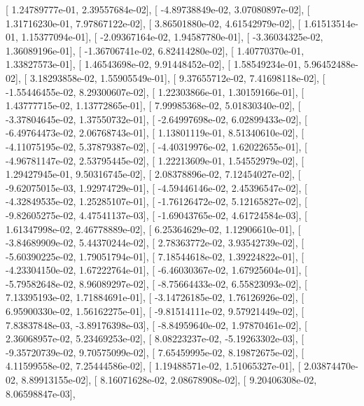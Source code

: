 \documentclass{article}
\begin{document}
       [  1.24789777e-01,   2.39557684e-02],
       [ -4.89738849e-02,   3.07080897e-02],
       [  1.31716230e-01,   7.97867122e-02],
       [  3.86501880e-02,   4.61542979e-02],
       [  1.61513514e-01,   1.15377094e-01],
       [ -2.09367164e-02,   1.94587780e-01],
       [ -3.36034325e-02,   1.36089196e-01],
       [ -1.36706741e-02,   6.82414280e-02],
       [  1.40770370e-01,   1.33827573e-01],
       [  1.46543698e-02,   9.91448452e-02],
       [  1.58549234e-01,   5.96452488e-02],
       [  3.18293858e-02,   1.55905549e-01],
       [  9.37655712e-02,   7.41698118e-02],
       [ -1.55446455e-02,   8.29300607e-02],
       [  1.22303866e-01,   1.30159166e-01],
       [  1.43777715e-02,   1.13772865e-01],
       [  7.99985368e-02,   5.01830340e-02],
       [ -3.37804645e-02,   1.37550732e-01],
       [ -2.64997698e-02,   6.02899433e-02],
       [ -6.49764473e-02,   2.06768743e-01],
       [  1.13801119e-01,   8.51340610e-02],
       [ -4.11075195e-02,   5.37879387e-02],
       [ -4.40319976e-02,   1.62022655e-01],
       [ -4.96781147e-02,   2.53795445e-02],
       [  1.22213609e-01,   1.54552979e-02],
       [  1.29427945e-01,   9.50316745e-02],
       [  2.08378896e-02,   7.12454027e-02],
       [ -9.62075015e-03,   1.92974729e-01],
       [ -4.59446146e-02,   2.45396547e-02],
       [ -4.32849535e-02,   1.25285107e-01],
       [ -1.76126472e-02,   5.12165827e-02],
       [ -9.82605275e-02,   4.47541137e-03],
       [ -1.69043765e-02,   4.61724584e-03],
       [  1.61347998e-02,   2.46778889e-02],
       [  6.25364629e-02,   1.12906610e-01],
       [ -3.84689909e-02,   5.44370244e-02],
       [  2.78363772e-02,   3.93542739e-02],
       [ -5.60390225e-02,   1.79051794e-01],
       [  7.18544618e-02,   1.39224822e-01],
       [ -4.23304150e-02,   1.67222764e-01],
       [ -6.46030367e-02,   1.67925604e-01],
       [ -5.79582648e-02,   8.96089297e-02],
       [ -8.75664433e-02,   6.55823093e-02],
       [  7.13395193e-02,   1.71884691e-01],
       [ -3.14726185e-02,   1.76126926e-02],
       [  6.95900330e-02,   1.56162275e-01],
       [ -9.81514111e-02,   9.57921449e-02],
       [  7.83837848e-03,  -3.89176398e-03],
       [ -8.84959640e-02,   1.97870461e-02],
       [  2.36068957e-02,   5.23469253e-02],
       [  8.08223237e-02,  -5.19263302e-03],
       [ -9.35720739e-02,   9.70575099e-02],
       [  7.65459995e-02,   8.19872675e-02],
       [  4.11599558e-02,   7.25444586e-02],
       [  1.19488571e-02,   1.51065327e-01],
       [  2.03874470e-02,   8.89913155e-02],
       [  8.16071628e-02,   2.08678908e-02],
       [  9.20406308e-02,   8.06598847e-03],
\end{document}
